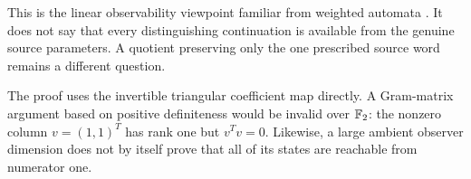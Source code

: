 This is the linear observability viewpoint familiar from weighted
automata \cite[Sections~1--3]{kiefer}. It does not say that every distinguishing
continuation is available from the genuine source parameters.
A quotient preserving only the one prescribed source word remains a
different question.

\begin{remark}
The proof uses the invertible triangular coefficient map directly.
A Gram-matrix argument based on positive definiteness would be invalid
over $\mathbb F_2$: the nonzero column $v=(1,1)^T$ has rank one but
$v^Tv=0$. Likewise, a large ambient observer dimension does not by
itself prove that all of its states are reachable from numerator one.
\end{remark}


